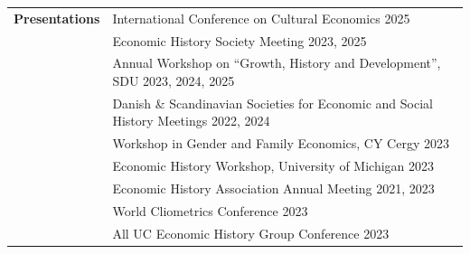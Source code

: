 \documentclass[a4paper,11pt,oneside]{article}
\begin{document}
\begin{longtable}{@{} p{0.175\linewidth} p{0.775\linewidth} p{0.05\linewidth}}
   
   
   
   \textbf{\large{Presentations}}  
   
  & \multicolumn{2}{l}{International Conference on Cultural Economics \hfill 2025}\\
     &  \multicolumn{2}{l}{ Economic History Society Meeting  \hfill 2023, 2025}\\ 
  & \multicolumn{2}{l}{Annual Workshop on ``Growth, History and Development'', SDU  \hfill 2023, 2024, 2025} \\  
   &  \multicolumn{2}{l}{ Danish  \& Scandinavian Societies for Economic and Social History Meetings   \hfill 2022, 2024} \\
   & \multicolumn{2}{l}{Workshop in Gender and Family Economics, CY Cergy  \hfill 2023}\\
     & \multicolumn{2}{l}{Economic History Workshop, University of Michigan \hfill 2023}\\
   & \multicolumn{2}{l}{ Economic History Association Annual Meeting   \hfill 2021, 2023}\\
   & \multicolumn{2}{l}{ World Cliometrics Conference  \hfill 2023 } \\
   & \multicolumn{2}{l}{ All UC Economic History Group Conference  \hfill 2023}\\


\end{longtable}
\end{document}
